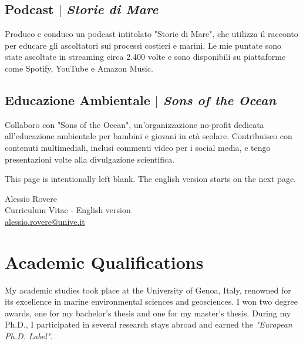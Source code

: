 \documentclass[11pt]{article}
\begin{document}
\subsection{Podcast $|$ {\normalfont\textit{Storie di Mare}}}
{\footnotesize Produco e conduco un podcast intitolato "Storie di Mare", che utilizza il racconto per educare gli ascoltatori sui processi costieri e marini. Le mie puntate sono state ascoltate in streaming circa 2.400 volte e sono disponibili su piattaforme come Spotify, YouTube e Amazon Music.}
\bigskip

\subsection{Educazione Ambientale $|$ {\normalfont\textit{Sons of the Ocean}}}
{\footnotesize Collaboro con "Sons of the Ocean", un'organizzazione no-profit dedicata all'educazione ambientale per bambini e giovani in età scolare. Contribuisco con contenuti multimediali, inclusi commenti video per i social media, e tengo presentazioni volte alla divulgazione scientifica.}

\newpage
This page is intentionally left blank. The english version starts on the next page.
\newpage

\newpage
\begin{center}
    {\fontsize{36}{36}\selectfont\interthin Alessio \interheavy Rovere} \\ \bigskip
    {\fontsize{14}{14}\selectfont\interthin Curriculum Vitae - English version}\\ \bigskip
    {\color{icnclr}\faEnvelope[regular]} \href{mailto:alessio.rovere@unive.it}{alessio.rovere@unive.it}
\end{center}

\section{Academic Qualifications}
{\normalfont My academic studies took place at the University of Genoa, Italy, renowned for its excellence in marine environmental sciences and geosciences. I won two degree awards, one for my bachelor's thesis and one for my master's thesis. During my Ph.D., I participated in several research stays abroad and earned the \textit{"European Ph.D. Label"}.} \\

\bigskip
\end{document}
